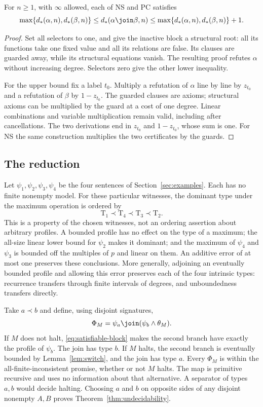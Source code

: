 \begin{lemma}\label{lem:join}
For $n\ge1$, with $\infty$ allowed, each of NS and PC satisfies
\[
 \max\{d_*(\alpha,n),d_*(\beta,n)\}
 \le d_*(\alpha\join\beta,n)
 \le\max\{d_*(\alpha,n),d_*(\beta,n)\}+1.
\]
\end{lemma}
\begin{proof}
Set all selectors to one, and give the inactive block a structural root:
all its functions take one fixed value and all its relations are false.
Its clauses are guarded away, while its structural equations vanish.
The resulting proof refutes $\alpha$ without increasing degree. Selectors
zero give the other lower inequality.

For the upper bound fix a label $t_0$. Multiply a refutation of $\alpha$
line by line by $z_{t_0}$ and a refutation of $\beta$ by $1-z_{t_0}$.
The guarded clauses are axioms; structural axioms can be multiplied by
the guard at a cost of one degree. Linear combinations and variable
multiplication remain valid, including after cancellations. The two
derivations end in $z_{t_0}$ and $1-z_{t_0}$, whose sum is one. For NS
the same construction multiplies the two certificates by the guards.
\end{proof}

\subsection{The reduction}
Let $\psi_1,\psi_2,\psi_3,\psi_4$ be the four sentences of
Section~\ref{sec:examples}. Each has no finite nonempty model. For these particular
witnesses, the dominant type under the maximum operation is ordered by
\[
                 \mathrm T_1\prec\mathrm T_4\prec\mathrm T_3\prec\mathrm T_2.
\]
This is a property of the chosen witnesses, not an ordering assertion about
arbitrary profiles. A bounded profile has no effect on the type of a maximum;
the all-size linear lower bound for $\psi_2$ makes it dominant; and the
maximum of $\psi_4$ and $\psi_3$ is bounded off the multiples of $p$ and
linear on them. An additive error of at most one preserves these conclusions.
More generally, adjoining an eventually bounded profile and allowing this
error preserves each of the four intrinsic types: recurrence transfers
through finite intervals of degrees, and unboundedness transfers directly.

Take $a\prec b$ and define, using disjoint signatures,
\[
             \Phi_M=\psi_a\join(\psi_b\wedge\theta_M).
\]
If $M$ does not halt, \eqref{eq:satisfiable-block} makes the second branch
have exactly the profile of $\psi_b$. The join has type $b$. If $M$ halts,
the second branch is eventually bounded by Lemma~\ref{lem:switch}, and the
join has type $a$. Every $\Phi_M$ is within the all-finite-inconsistent
promise, whether or not $M$ halts. The map is primitive recursive and
uses no information about that alternative. A separator of types $a,b$
would decide halting. Choosing $a$ and $b$ on opposite sides of any
disjoint nonempty $A,B$ proves Theorem~\ref{thm:undecidability}.
